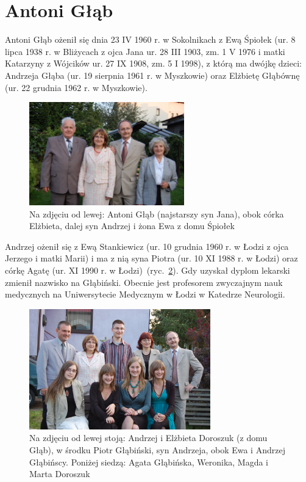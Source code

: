 \section{Antoni Głąb}
Antoni Głąb ożenił się dnia 23 IV 1960 r. w Sokolnikach z Ewą Śpiołek (ur. 8 lipca 1938 r. w Bliżycach z ojca Jana ur. 28 III 1903, zm. 1 V 1976 i matki Katarzyny z Wójcików ur. 27 IX 1908, zm. 5 I 1998), z którą ma dwójkę dzieci: Andrzeja Głąba (ur. 19 sierpnia 1961 r. w Myszkowie) oraz Elżbietę Głąbównę (ur. 22 grudnia 1962 r. w Myszkowie).


\begin{figure}[!h]
\begin{center}
\includegraphics[width=0.6\textwidth]{zdjecia/ewa_antoni_glab_z_dziecmi.jpg}
\caption[Antoni Głąb z żoną i dziećmi]{Na zdjęciu od lewej: Antoni Głąb (najstarszy syn Jana), obok córka Elżbieta, dalej syn Andrzej i żona Ewa z domu Śpiołek}
\label{rys:ewa_antoni_glab_z_dziecmi}
\end{center}
\end{figure}

Andrzej ożenił się z Ewą Stankiewicz (ur. 10 grudnia 1960 r. w Łodzi z ojca Jerzego i matki Marii) i ma z nią syna Piotra (ur. 10 XI 1988 r. w Łodzi) oraz córkę Agatę (ur. XI 1990 r. w Łodzi)~(ryc.~\ref{rys:elzbieta_anrzej_glab_z_dziecmi}). Gdy uzyskał dyplom lekarski zmienił nazwisko na Głąbiński. Obecnie jest profesorem zwyczajnym nauk medycznych na Uniwersytecie Medycznym w Łodzi w Katedrze Neurologii.

\begin{figure}[!h]
\begin{center}
\includegraphics[width=0.7\textwidth]{zdjecia/elzbieta_anrzej_glab_z_dziecmi.jpg}
\caption[Elżbieta Doroszuk i Andrzej Głąbiński z rodzinami]{Na zdjęciu od lewej stoją: Andrzej i Elżbieta Doroszuk (z domu Głąb), w środku Piotr Głąbiński, syn Andrzeja, obok Ewa i Andrzej Głąbińscy. Poniżej siedzą: Agata Głąbińska, Weronika, Magda i Marta Doroszuk}
\label{rys:elzbieta_anrzej_glab_z_dziecmi}
\end{center}
\end{figure}

